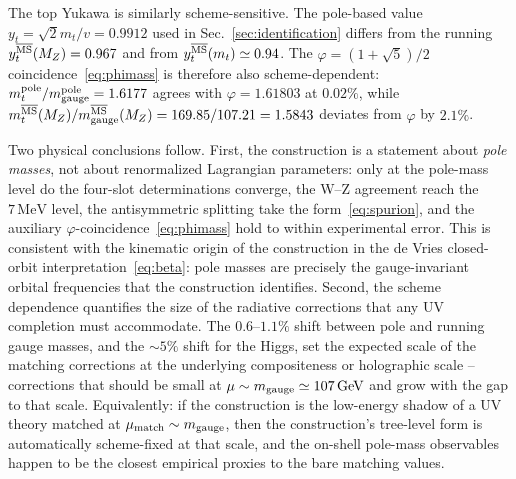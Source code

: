 \documentclass[twocolumn,aps,prd,floatfix,nofootinbib,superscriptaddress,10pt]{article}
\newcommand{\MZ}{M_Z}
\newcommand{\GeV}{\,\mathrm{GeV}}
\newcommand{\MeV}{\,\mathrm{MeV}}
\begin{document}
The top Yukawa is similarly scheme-sensitive. The pole-based value $y_t=\sqrt{2}m_t/v=0.9912$ used in Sec.~\ref{sec:identification} differs from the running $y_t^{\overline{\rm MS}}(\MZ)=0.967$ and from $y_t^{\overline{\rm MS}}(m_t)\simeq 0.94$. The $\varphi=(1+\sqrt5)/2$ coincidence~\eqref{eq:phimass} is therefore also scheme-dependent: $m_t^{\rm pole}/m_{\rm gauge}^{\rm pole} = 1.6177$ agrees with $\varphi=1.61803$ at $0.02\%$, while $m_t^{\overline{\rm MS}}(\MZ)/m_{\rm gauge}^{\overline{\rm MS}}(\MZ) = 169.85/107.21 = 1.5843$ deviates from $\varphi$ by $2.1\%$.

Two physical conclusions follow. First, the construction is a statement about {\em pole masses}, not about renormalized Lagrangian parameters: only at the pole-mass level do the four-slot determinations converge, the W--Z agreement reach the $7\MeV$ level, the antisymmetric splitting take the form~\eqref{eq:spurion}, and the auxiliary $\varphi$-coincidence~\eqref{eq:phimass} hold to within experimental error. This is consistent with the kinematic origin of the construction in the de Vries closed-orbit interpretation~\eqref{eq:beta}: pole masses are precisely the gauge-invariant orbital frequencies that the construction identifies. Second, the scheme dependence quantifies the size of the radiative corrections that any UV completion must accommodate. The $0.6$--$1.1\%$ shift between pole and running gauge masses, and the $\sim 5\%$ shift for the Higgs, set the expected scale of the matching corrections at the underlying compositeness or holographic scale -- corrections that should be small at $\mu\sim m_{\rm gauge}\simeq 107\GeV$ and grow with the gap to that scale. Equivalently: if the construction is the low-energy shadow of a UV theory matched at $\mu_{\rm match}\sim m_{\rm gauge}$, then the construction's tree-level form is automatically scheme-fixed at that scale, and the on-shell pole-mass observables happen to be the closest empirical proxies to the bare matching values.
\end{document}

